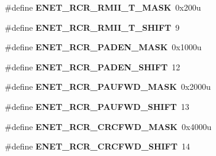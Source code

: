 \begin{DoxyCompactItemize}
\item 
\hypertarget{group___e_n_e_t___register___masks_gad12b342c371a09b9fa529abf0df4df3d}{}\#define {\bfseries E\+N\+E\+T\+\_\+\+R\+C\+R\+\_\+\+R\+M\+I\+I\+\_\+T\+\_\+\+M\+A\+S\+K}~0x200u\label{group___e_n_e_t___register___masks_gad12b342c371a09b9fa529abf0df4df3d}

\item 
\hypertarget{group___e_n_e_t___register___masks_gae380a88454073abac2947ac8a5959880}{}\#define {\bfseries E\+N\+E\+T\+\_\+\+R\+C\+R\+\_\+\+R\+M\+I\+I\+\_\+T\+\_\+\+S\+H\+I\+F\+T}~9\label{group___e_n_e_t___register___masks_gae380a88454073abac2947ac8a5959880}

\item 
\hypertarget{group___e_n_e_t___register___masks_gab6a8c4abb6a9bd525324ca790a9255bf}{}\#define {\bfseries E\+N\+E\+T\+\_\+\+R\+C\+R\+\_\+\+P\+A\+D\+E\+N\+\_\+\+M\+A\+S\+K}~0x1000u\label{group___e_n_e_t___register___masks_gab6a8c4abb6a9bd525324ca790a9255bf}

\item 
\hypertarget{group___e_n_e_t___register___masks_ga0aa5cc8815e76a8054a4dc13c5006118}{}\#define {\bfseries E\+N\+E\+T\+\_\+\+R\+C\+R\+\_\+\+P\+A\+D\+E\+N\+\_\+\+S\+H\+I\+F\+T}~12\label{group___e_n_e_t___register___masks_ga0aa5cc8815e76a8054a4dc13c5006118}

\item 
\hypertarget{group___e_n_e_t___register___masks_ga664fa2802383748f83527ad422cede34}{}\#define {\bfseries E\+N\+E\+T\+\_\+\+R\+C\+R\+\_\+\+P\+A\+U\+F\+W\+D\+\_\+\+M\+A\+S\+K}~0x2000u\label{group___e_n_e_t___register___masks_ga664fa2802383748f83527ad422cede34}

\item 
\hypertarget{group___e_n_e_t___register___masks_gace2ee9a69ab345416d6f15835b49f689}{}\#define {\bfseries E\+N\+E\+T\+\_\+\+R\+C\+R\+\_\+\+P\+A\+U\+F\+W\+D\+\_\+\+S\+H\+I\+F\+T}~13\label{group___e_n_e_t___register___masks_gace2ee9a69ab345416d6f15835b49f689}

\item 
\hypertarget{group___e_n_e_t___register___masks_gab00e088ecf7a8439af6dfc86951e65a9}{}\#define {\bfseries E\+N\+E\+T\+\_\+\+R\+C\+R\+\_\+\+C\+R\+C\+F\+W\+D\+\_\+\+M\+A\+S\+K}~0x4000u\label{group___e_n_e_t___register___masks_gab00e088ecf7a8439af6dfc86951e65a9}

\item 
\hypertarget{group___e_n_e_t___register___masks_gacc33ea25694cc26264d3bec46a69fa2d}{}\#define {\bfseries E\+N\+E\+T\+\_\+\+R\+C\+R\+\_\+\+C\+R\+C\+F\+W\+D\+\_\+\+S\+H\+I\+F\+T}~14\label{group___e_n_e_t___register___masks_gacc33ea25694cc26264d3bec46a69fa2d}


\end{DoxyCompactItemize}
